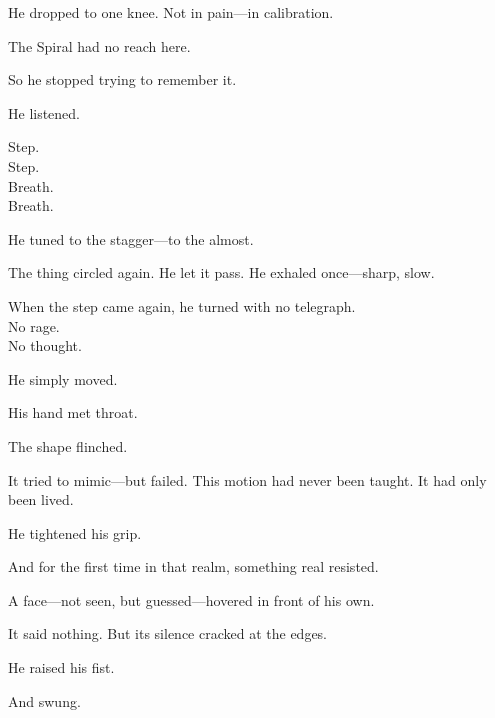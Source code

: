 \documentclass[9pt]{article}
\begin{document}
\vspace{0.5em}
He dropped to one knee. Not in pain---in calibration.

\vspace{0.5em}
The Spiral had no reach here.

\vspace{0.5em}
So he stopped trying to remember it.

\vspace{0.5em}
He listened.

\vspace{0.5em}
Step.\\
Step.\\
Breath.\\
Breath.

\vspace{0.5em}
He tuned to the stagger---to the almost.

\vspace{0.5em}
The thing circled again. He let it pass. He exhaled once---sharp, slow.

\vspace{0.5em}
When the step came again, he turned with no telegraph.\\
No rage.\\
No thought.

\vspace{0.5em}
He simply moved.

\vspace{0.5em}
His hand met throat.

\vspace{0.5em}
The shape flinched.

\vspace{0.5em}
It tried to mimic---but failed. This motion had never been taught. It had only been lived.

\vspace{0.5em}
He tightened his grip.

\vspace{0.5em}
And for the first time in that realm, something real resisted.

\vspace{0.5em}
A face---not seen, but guessed---hovered in front of his own.

\vspace{0.5em}
It said nothing. But its silence cracked at the edges.

\vspace{0.5em}
He raised his fist.

\vspace{0.5em}
And swung.
\end{document}
